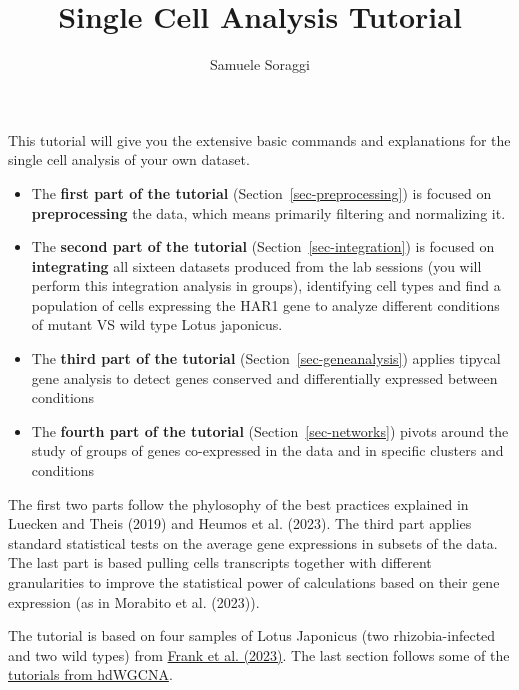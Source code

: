 \documentclass[
  letterpaper,
  DIV=11,
  numbers=noendperiod]{scrartcl}
\title{Single Cell Analysis Tutorial}
\author{Samuele Soraggi}
\date{}
\renewcommand*\contentsname{Table of contents}
\newcommand\contentsname{Table of contents}
\begin{document}
\maketitle
\renewcommand*\contentsname{Table of contents}
{
\hypersetup{linkcolor=}
\setcounter{tocdepth}{3}
\tableofcontents
}
This tutorial will give you the extensive basic commands and
explanations for the single cell analysis of your own dataset.

\begin{itemize}
\item
  The \textbf{first part of the tutorial}
  (Section~\ref{sec-preprocessing}) is focused on \textbf{preprocessing}
  the data, which means primarily filtering and normalizing it.
\item
  The \textbf{second part of the tutorial}
  (Section~\ref{sec-integration}) is focused on \textbf{integrating} all
  sixteen datasets produced from the lab sessions (you will perform this
  integration analysis in groups), identifying cell types and find a
  population of cells expressing the HAR1 gene to analyze different
  conditions of mutant VS wild type Lotus japonicus.
\item
  The \textbf{third part of the tutorial}
  (Section~\ref{sec-geneanalysis}) applies tipycal gene analysis to
  detect genes conserved and differentially expressed between conditions
\item
  The \textbf{fourth part of the tutorial} (Section~\ref{sec-networks})
  pivots around the study of groups of genes co-expressed in the data
  and in specific clusters and conditions
\end{itemize}

The first two parts follow the phylosophy of the best practices
explained in Luecken and Theis (2019) and Heumos et al. (2023). The
third part applies standard statistical tests on the average gene
expressions in subsets of the data. The last part is based pulling cells
transcripts together with different granularities to improve the
statistical power of calculations based on their gene expression (as in
Morabito et al. (2023)).

The tutorial is based on four samples of Lotus Japonicus (two
rhizobia-infected and two wild types) from
\href{https://www.ncbi.nlm.nih.gov/pmc/articles/PMC10630511/pdf/41467_2023_Article_42911.pdf}{Frank
et al. (2023)}. The last section follows some of the
\href{https://smorabit.github.io/hdWGCNA/}{tutorials from hdWGCNA}.
\end{document}
